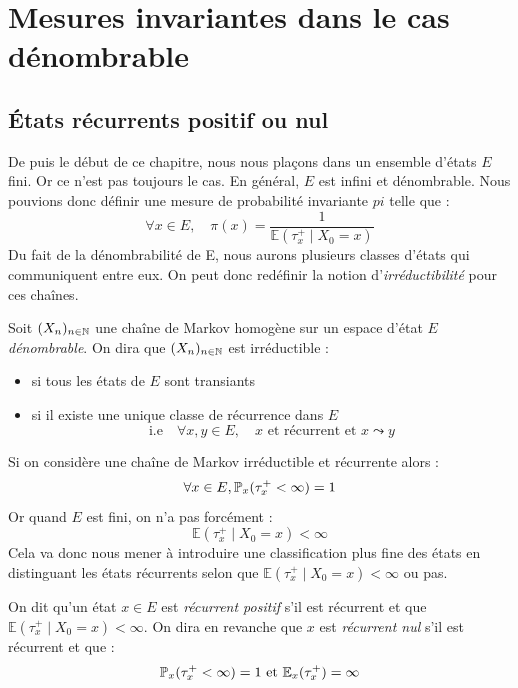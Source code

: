 \section{Mesures invariantes dans le cas dénombrable}

\subsection{États récurrents positif ou nul}

De puis le début de ce chapitre, nous nous plaçons dans un ensemble d'états $E$ fini. Or ce n'est pas toujours 
le cas. En général, $E$ est infini et dénombrable. Nous pouvions donc définir une mesure de 
probabilité invariante $ pi$ telle que : 
    \[ \forall x \in E, \quad \pi(x) = \frac{1}{ \mathbb{E}( \tau_x^+ \mid X_0 = x) }  \] 
Du fait de la dénombrabilité de E, nous aurons plusieurs classes d'états qui communiquent entre eux. 
On peut donc redéfinir la notion d'\emph{irréductibilité} pour ces chaînes. 

\begin{definition}
    Soit $(X_n)_{n \in \mathbb{N}}$ une chaîne de Markov homogène sur un espace d'état $E$ \emph{dénombrable}. 
    On dira que $(X_n)_{n \in \mathbb{N}}$ est irréductible : 
    \begin{itemize}
        \item si tous les états de $E$ sont transiants 
        \item si il existe une unique classe de récurrence dans $E$
            \[ \text{i.e} \quad \forall x,y \in E, \quad x \text{ et récurrent et } x \leadsto y \] 
    \end{itemize}
\end{definition}

\begin{remark}
    Si on considère une chaîne de Markov irréductible et récurrente alors : 
        $$ \forall x \in E, \mathbb{P}_x( \tau_x^+ < \infty) = 1$$ 
    Or quand $E$ est fini, on n'a pas forcément : 
        $$  \mathbb{E}( \tau_x^+ \mid X_0 = x) < \infty $$ 
    Cela va donc nous mener à introduire une classification plus fine des états en distinguant les états récurrents 
    selon que $ \mathbb{E}( \tau_x^+ \mid X_0 = x) < \infty$ ou pas. 
\end{remark}

\begin{definition}
    On dit qu'un état $x \in E$ est \emph{récurrent positif} s'il est récurrent et que $ \mathbb{E}( \tau_x^+ \mid X_0 = x) < \infty$. 
    On dira en revanche que $x$ est \emph{récurrent nul} s'il est récurrent et que : 
        \[ \mathbb{P}_x( \tau_x^+ < \infty) = 1 \text{ et } \mathbb{E}_x( \tau_x^+) = \infty \] 
\end{definition}

